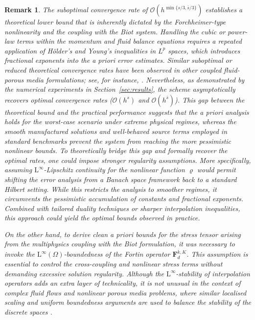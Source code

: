 \documentclass[fleqn,a4paper]{cas-sc}
\newcommand{\bF}{\mathbf{F}}
\newcommand{\0}{\boldsymbol{0}}
\numberwithin{equation}{section}
\numberwithin{figure}{section}
\newtheorem{remark}{Remark}[section]
\begin{document}
\begin{remark}
        {The suboptimal convergence rate of $\mathcal{O}(h^{\min\{s/3, \bar{s}/3\}})$ establishes a   theoretical lower bound that is inherently dictated by the  Forchheimer-type nonlinearity and the coupling with the Biot system. Handling the cubic or power-law terms within the momentum and fluid balance equations requires a repeated application of Hölder's and Young's inequalities in $L^p$ spaces, which introduces fractional exponents into the a priori error estimates. Similar suboptimal or reduced theoretical convergence rates have been observed in other coupled fluid-porous media formulations; see, for instance, \cite{Caucao2020,caucao2021}. Nevertheless, as demonstrated by the numerical experiments in Section~\ref{sec:results}, the scheme asymptotically recovers optimal convergence rates ($\mathcal{O}(h^s)$ and $\mathcal{O}(h^{\bar{s}})$). This gap between the theoretical bound and the practical performance suggests that the a priori analysis holds for the worst-case scenario under extreme physical regimes, whereas the smooth manufactured solutions and well-behaved source terms employed in standard benchmarks prevent the system from reaching the more pessimistic nonlinear bounds. To theoretically bridge this gap and formally recover the optimal rates, one could impose stronger regularity assumptions. More specifically, assuming $\mathrm{L}^\infty$-Lipschitz continuity for the nonlinear function $\varrho$ would permit shifting the error analysis from a Banach space framework back to a standard Hilbert  setting. While this restricts the analysis to smoother regimes, it circumvents the pessimistic accumulation of constants and fractional exponents. Combined with tailored duality techniques or sharper interpolation inequalities, this approach could yield the optimal bounds observed in practice.
        
         On the other hand, to derive clean a priori bounds for the stress tensor arising from the multiphysics coupling with the Biot formulation, it was necessary to invoke the $\mathrm{L}^\infty(\Omega)$-boundedness of the Fortin operator $\bF_d^{\overline{k},K}$. This assumption is essential to control the cross-coupling and nonlinear stress terms without demanding excessive solution regularity. Although the $\mathrm{L}^\infty$-stability of interpolation operators adds an extra layer of technicality, it is not unusual in the context of complex fluid flows and nonlinear porous media problems, where similar localised scaling and uniform boundedness arguments are used to balance the stability of the discrete spaces \cite{cangiani20,Dehghan2023}.}
\end{remark}
\end{document}
